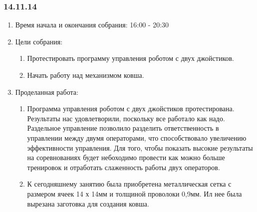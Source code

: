 
\subsubsection{14.11.14}

\begin{enumerate} 
	\item Время начала и окончания собрания:
	16:00 - 20:30
	\item Цели собрания:
	\begin{enumerate}
		\item Протестировать программу управления роботом с двух джойстиков.
		
		\item Начать работу над механизмом ковша.
		
	\end{enumerate}
	
	\item Проделанная работа:
	\begin{enumerate}
		\item Программа управления роботом с двух джойстиков протестирована. Результаты нас удовлетворили, поскольку все работало как надо. Раздельное управление позволило разделить ответственность в управлении между двумя операторами, что способствовало увеличению эффективности управления. Для того, чтобы показать высокие результаты на соревнованиях будет небоходимо провести как можно больше тренировок и отработать слаженность работы двух операторов.
		
		\item К сегодняшнему занятию была приобретена металлическая сетка с размером ячеек 14 х 14мм и толщиной проволоки 0,9мм. Ил нее была вырезана заготовка для создания ковша.
		

\end{enumerate}
\end{enumerate}
